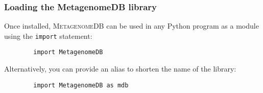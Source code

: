 \documentclass[handout]{beamer}
\begin{document}
\begin{frame}[fragile]
	\frametitle{Loading the MetagenomeDB library}
	Once installed, \textsc{MetagenomeDB} can be used in any Python program as a module using the \texttt{import} statement:

	\begin{verbatim}
		import MetagenomeDB
	\end{verbatim}

	Alternatively, you can provide an alias to shorten the name of the library:

	\begin{verbatim}
		import MetagenomeDB as mdb
	\end{verbatim}
\end{frame}

\end{document}
